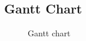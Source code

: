 

        \newpage
        \justifying
        \subsection{Gantt Chart}
            \begin{figure}[hbt!]
                \caption{Gantt chart}
            \end{figure}

